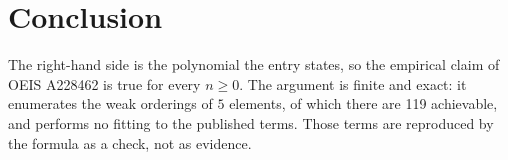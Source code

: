 \documentclass[11pt,a4paper]{article}
\theoremstyle{plain}
\theoremstyle{definition}
\begin{document}
\section{Conclusion}

The right-hand side is the polynomial the entry states, so the empirical claim of OEIS A228462 is
true for every $n\ge 0$. The argument is finite and exact: it enumerates the weak orderings of
$5$ elements, of which there are 119 achievable, and performs no fitting to the
published terms. Those terms are reproduced by the formula as a check, not as evidence.
\end{document}
